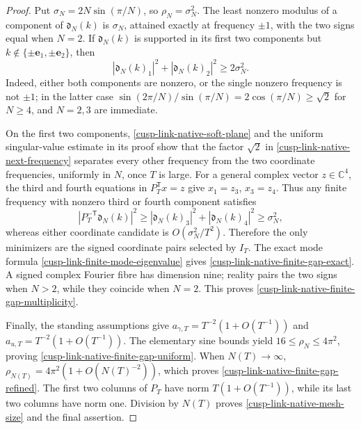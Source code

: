 \documentclass[11pt]{article}
\theoremstyle{definition}
\numberwithin{equation}{section}
\begin{document}
\begin{proof}
Put \(\sigma_N=2N\sin(\pi/N)\), so \(\rho_N=\sigma_N^2\).  The least
nonzero modulus of a component of \(\mathfrak d_N(k)\) is \(\sigma_N\),
attained exactly at frequency \(\pm1\), with the two signs equal when
\(N=2\).  If \(\mathfrak d_N(k)\) is supported in its first two components
but \(k\notin\{\pm\mathbf e_1,\pm\mathbf e_2\}\), then
\begin{equation}
 |\mathfrak d_N(k)_1|^2+|\mathfrak d_N(k)_2|^2\ge2\sigma_N^2.
 \label{cusp-link-native-next-frequency}
\end{equation}
Indeed, either both components are nonzero, or the single nonzero frequency
is not \(\pm1\); in the latter case
\(\sin(2\pi/N)/\sin(\pi/N)=2\cos(\pi/N)\ge\sqrt2\) for \(N\ge4\), and
\(N=2,3\) are immediate.

On the first two components, \eqref{cusp-link-native-soft-plane} and the
uniform singular-value estimate in its proof show that the factor
\(\sqrt2\) in \eqref{cusp-link-native-next-frequency} separates every other
frequency from the two coordinate frequencies, uniformly in \(N\), once
\(T\) is large.  For a general complex vector \(z\in\mathbb C^4\), the
third and fourth equations in \(P_T^{\mathsf T}x=z\) give
\(x_1=z_3\), \(x_3=z_4\).  Thus any finite frequency with nonzero third or
fourth component satisfies
\[
 |P_T^{-\mathsf T}\mathfrak d_N(k)|^2
 \ge|\mathfrak d_N(k)_3|^2+|\mathfrak d_N(k)_4|^2
 \ge\sigma_N^2,
\]
whereas either coordinate candidate is \(O(\sigma_N^2/T^2)\).  Therefore the
only minimizers are the signed coordinate pairs selected by \(I_T\).
The exact mode formula \eqref{cusp-link-finite-mode-eigenvalue} gives
\eqref{cusp-link-native-finite-gap-exact}.  A signed complex Fourier fibre has
dimension nine; reality pairs the two signs when \(N>2\), while they coincide
when \(N=2\).  This proves
\eqref{cusp-link-native-finite-gap-multiplicity}.

Finally, the standing assumptions give
\(a_{\gamma,T}=T^{-2}(1+O(T^{-1}))\) and
\(a_{u,T}=T^{-2}(1+O(T^{-1}))\).  The elementary sine bounds yield
\(16\le\rho_N\le4\pi^2\), proving
\eqref{cusp-link-native-finite-gap-uniform}.  When \(N(T)\to\infty\),
\(\rho_{N(T)}=4\pi^2(1+O(N(T)^{-2}))\), which proves
\eqref{cusp-link-native-finite-gap-refined}.  The first two columns of
\(P_T\) have norm \(T(1+O(T^{-1}))\), while its last two columns have norm
one.  Division by \(N(T)\) proves \eqref{cusp-link-native-mesh-size} and the
final assertion.
\end{proof}
\end{document}
